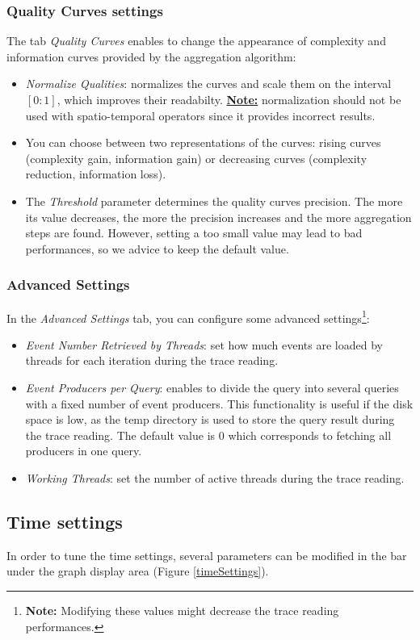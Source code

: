 \documentclass[twoside]{article}
\begin{document}
\begin{sloppypar}
\subsubsection{Quality Curves settings}
The tab \textit{Quality Curves} enables to change the appearance of complexity and information curves provided by the aggregation algorithm:
\begin{itemize}
	\item \textit{Normalize Qualities}: normalizes the curves and scale them on the interval $[0:1]$, which improves their readabilty. \underline{\textbf{Note:}} normalization should not be used with spatio-temporal operators since it provides incorrect results.
    \item You can choose between two representations of the curves: rising curves (complexity gain, information gain) or decreasing curves (complexity reduction, information loss).
    \item The \textit{Threshold} parameter determines the quality curves precision. The more its value decreases, the more the precision increases and the more aggregation steps are found. However, setting a too small value may lead to bad performances, so we advice to keep the default value.
\end{itemize}


\subsubsection{Advanced Settings}
In the \textit{Advanced Settings} tab, you can configure some advanced settings\footnote{\textbf{Note:} Modifying these values might decrease the trace reading performances.}:
\begin{itemize}
	\item \textit{Event Number Retrieved by Threads}: set how much events are loaded by threads for each iteration during the trace reading.
	\item \textit{Event Producers per Query}: enables to divide the query into several queries with a fixed number of event producers. This functionality is useful if the disk space is low, as the temp directory is used to store the query result during the trace reading. The default value is 0 which corresponds to fetching all producers in one query.
	\item \textit{Working Threads}: set the number of active threads during the trace reading. 
\end{itemize}

\subsection{Time settings}
In order to tune the time settings, several parameters can be modified in the bar under the graph display area (Figure \ref{timeSettings}).
 

\end{sloppypar}
\end{document}
